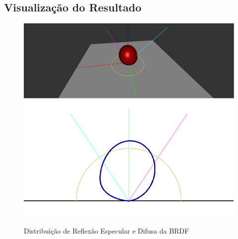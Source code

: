 \subsection{Visualização do Resultado}
\begin{figure}[H]
    \caption{\small{Distribuição de Reflexão Especular e Difusa da BRDF}}\label{fig-edwards-2006-eqlang}
    \vspace{42px}
  \includegraphics[width=\linewidth]{./Imagens/brdfs/edwards-2006-3D-plot}
\endminipage\hfill
{}
  \includegraphics[width=\linewidth]{./Imagens/brdfs/edwards-2006-polar-plot.png}
\endminipage\hfill
\end{figure}

